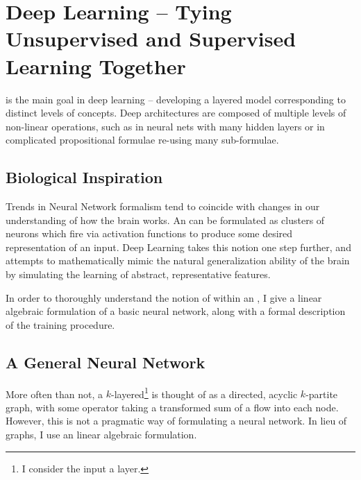 
\chapter{Deep Learning -- Tying Unsupervised and Supervised Learning Together}

 is the main goal in deep learning -- developing a layered model corresponding to distinct levels of concepts. Deep architectures are composed of multiple levels of non-linear operations, such as in neural nets with many hidden layers or in complicated propositional formulae re-using many sub-formulae\citep{Bengio2009LearningDeep}.

\section{Biological Inspiration}

Trends in Neural Network formalism tend to coincide with changes in our understanding of how the brain works. An \ann{} can be formulated as clusters of neurons which fire via activation functions to produce some desired representation of an input. Deep Learning takes this notion one step further, and attempts to mathematically mimic the natural generalization ability of the brain by simulating the learning of abstract, representative features.

In order to thoroughly understand the notion of \dl{} within an \ann{}, I give a linear algebraic formulation of a basic neural network, along with a formal description of the training procedure.

\section{A General Neural Network}

More often than not, a $k$-layered\footnote{I consider the input a layer.} \ann{} is thought of as a directed, acyclic $k$-partite graph, with some operator taking a transformed sum of a flow into each node. However, this is not a pragmatic way of formulating a neural network. In lieu of graphs, I use an  linear algebraic formulation. 

